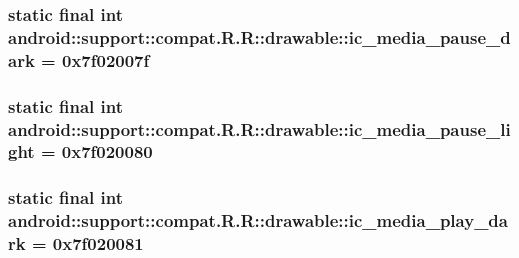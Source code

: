 \hypertarget{classandroid_1_1support_1_1compat_1_1_r_1_1drawable_fcff8af971239dea28fd69a25af467c7}{
\subsubsection[{ic\_\-media\_\-pause\_\-dark}]{\setlength{\rightskip}{0pt plus 5cm}static final int android::support::compat.R.R::drawable::ic\_\-media\_\-pause\_\-dark = 0x7f02007f}}
\label{classandroid_1_1support_1_1compat_1_1_r_1_1drawable_fcff8af971239dea28fd69a25af467c7}


\hypertarget{classandroid_1_1support_1_1compat_1_1_r_1_1drawable_b21a78df8ad98e0367bec988b7eb5605}{
\subsubsection[{ic\_\-media\_\-pause\_\-light}]{\setlength{\rightskip}{0pt plus 5cm}static final int android::support::compat.R.R::drawable::ic\_\-media\_\-pause\_\-light = 0x7f020080}}
\label{classandroid_1_1support_1_1compat_1_1_r_1_1drawable_b21a78df8ad98e0367bec988b7eb5605}


\hypertarget{classandroid_1_1support_1_1compat_1_1_r_1_1drawable_1e55390dc4f8e43f502ab7ebf247bb48}{
\subsubsection[{ic\_\-media\_\-play\_\-dark}]{\setlength{\rightskip}{0pt plus 5cm}static final int android::support::compat.R.R::drawable::ic\_\-media\_\-play\_\-dark = 0x7f020081}}
\label{classandroid_1_1support_1_1compat_1_1_r_1_1drawable_1e55390dc4f8e43f502ab7ebf247bb48}


